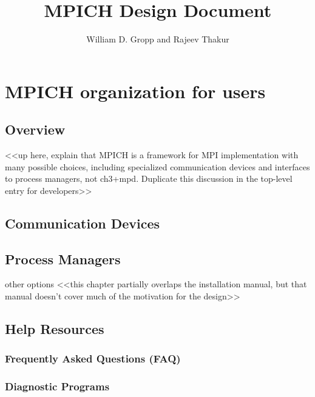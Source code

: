 \documentclass{report}
\begin{document}

\title{MPICH Design Document}
\author{William D. Gropp and Rajeev Thakur}
\maketitle

\tableofcontents
\clearpage



\pagestyle{headings}

\part{MPICH organization for users}

\chapter{Overview}
     <<up here, explain that MPICH is a framework for MPI implementation with many possible choices, including specialized communication devices and interfaces to process managers, not ch3+mpd.  Duplicate this discussion in the top-level entry for developers>>

\chapter{Communication Devices}

\chapter{Process Managers}

    other options 
    <<this chapter partially overlaps the installation manual, but that manual doesn't cover much of the motivation for the design>>

\chapter{Help Resources}

\section{Frequently Asked Questions (FAQ)}

\section{Diagnostic Programs}
\end{document}
